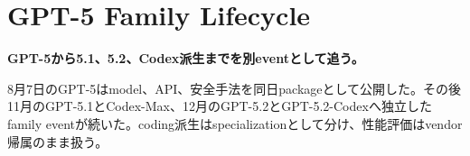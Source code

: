 \section{GPT-5 Family Lifecycle}
\noindent\textbf{GPT-5から5.1、5.2、Codex派生までを別eventとして追う。}\autocite{src-05738f6c55b7,src-964121647555,src-aec54e92a7f3}

8月7日のGPT-5はmodel、API、安全手法を同日packageとして公開した。その後11月のGPT-5.1とCodex-Max、12月のGPT-5.2とGPT-5.2-Codexへ独立したfamily eventが続いた。coding派生はspecializationとして分け、性能評価はvendor帰属のまま扱う。\autocite{src-05738f6c55b7,src-10ab1c39be14,src-55da04f42e32,src-5bea303cfdb1,src-964121647555,src-aec54e92a7f3,src-cd8d6c8023f2}

